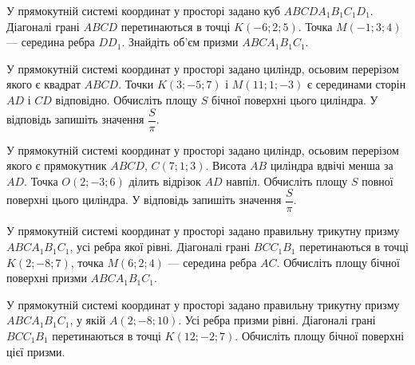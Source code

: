 \documentclass[12pt]{article}
\begin{document}
\begin{samepage}
\noindent\zadnum У прямокутній системі координат у просторі задано куб $ABCDA_1B_1C_1D_1$. Діагоналі грані $ABCD$ перетинаються в точці $K(-6; 2; 5)$. Точка $M(-1; 3; 4)$ --- середина ребра $DD_1$. Знайдіть об'єм призми $ABCA_1B_1C_1$. 
\nmtAnswerBox
\par{}
\end{samepage}

\begin{samepage}
\noindent\zadnum У прямокутній системі координат у просторі задано циліндр, осьовим перерізом якого є квадрат $ABCD$. Точки $K(3; -5; 7)$ і $M(11; 1; -3)$ є серединами сторін $AD$ і $CD$ відповідно. Обчисліть площу $S$ бічної поверхні цього циліндра. У відповідь запишіть значення $\dfrac{S}{\pi}$. 
\nmtAnswerBox
\par{}
\end{samepage}

\begin{samepage}
\noindent\zadnum У прямокутній системі координат у просторі задано циліндр, осьовим перерізом якого є прямокутник $ABCD$, $C(7; 1; 3)$. Висота $AB$ циліндра вдвічі менша за $AD$. Точка $O(2; -3; 6)$ ділить відрізок $AD$ навпіл. Обчисліть площу $S$ повної поверхні цього циліндра. У відповідь запишіть значення $\dfrac{S}{\pi}$. 
\nmtAnswerBox
\par{}
\end{samepage}

\begin{samepage}
\noindent\zadnum У прямокутній системі координат у просторі задано правильну трикутну призму $ABCA_1B_1C_1$, усі ребра якої рівні. Діагоналі грані $BCC_1B_1$ перетинаються в точці $K(2; -8; 7)$, точка $M(6; 2; 4)$ --- середина ребра $AC$. Обчисліть площу бічної поверхні призми $ABCA_1B_1C_1$. 
\nmtAnswerBox
\par{}
\end{samepage}

\begin{samepage}
\noindent\zadnum У прямокутній системі координат у просторі задано правильну трикутну призму $ABCA_1B_1C_1$, у якій $A(2; -8; 10)$. Усі ребра призми рівні. Діагоналі грані $BCC_1B_1$ перетинаються в точці $K(12; -2; 7)$. Обчисліть площу бічної поверхні цієї призми. 
\nmtAnswerBox
\par{}
\end{samepage}
\end{document}
